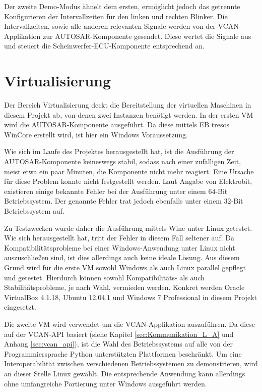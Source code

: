 \documentclass[
  a4paper,					    %
  twoside,
  DIV=calc,     				%
  bibliography=totoc,
  cleardoublepage=empty,
  ngerman,     					%
  final       					%
]{scrbook}
\begin{document}
Der zweite Demo-Modus ähnelt dem ersten, ermöglicht jedoch das getrennte Konfigurieren der Intervallzeiten für den linken und rechten Blinker. Die Intervallzeiten, sowie alle anderen relevanten Signale werden von der VCAN-Applikation zur AUTOSAR-Komponente gesendet. Diese wertet die Signale aus und steuert die Scheinwerfer-ECU-Komponente entsprechend an.


\section{Virtualisierung}
\label{sec:Virtualisierung_Umgesetzt}
Der Bereich Virtualisierung deckt die Bereitstellung der virtuellen Maschinen in diesem Projekt ab, von denen zwei Instanzen benötigt werden. In der ersten VM wird die AUTOSAR-Komponente ausgeführt. Da diese mittels EB tresos WinCore erstellt wird, ist hier ein Windows Voraussetzung.

Wie sich im Laufe des Projektes herausgestellt hat, ist die Ausführung der AUTOSAR-Komponente keineswegs stabil, sodass nach einer zufälligen Zeit, meist etwa ein paar Minuten, die Komponente nicht mehr reagiert. Eine Ursache für diese Problem konnte nicht festgestellt werden. Laut Angabe von Elektrobit, existieren einige bekannte Fehler bei der Ausführung unter einem 64-Bit Betriebssystem. Der genannte Fehler trat jedoch ebenfalls unter einem 32-Bit Betriebssystem auf.

Zu Testzwecken wurde daher die Ausführung mittels Wine unter Linux getestet. Wie sich herausgestellt hat, tritt der Fehler in diesem Fall seltener auf. Da Kompatibilitätsprobleme bei einer Windows-Anwendung unter Linux nicht auszuschließen sind, ist dies allerdings auch keine ideale Lösung. Aus diesem Grund wird für die erste VM sowohl Windows als auch Linux parallel gepflegt und getestet. Hierdurch können sowohl Kompatibilitäts- als auch Stabilitätsprobleme, je nach Wahl, vermieden werden. Konkret werden Oracle VirtualBox 4.1.18, Ubuntu 12.04.1 und Windows 7 Professional in diesem Projekt eingesetzt.

Die zweite VM wird verwendet um die VCAN-Applikation auszuführen. Da diese auf der VCAN-API basiert (siehe Kapitel \ref{sec:Kommunikation_L_A} und Anhang \ref{sec:vcan_api}), ist die Wahl des Betriebssystems auf alle von der Programmiersprache Python unterstützten Plattformen beschränkt. Um eine Interoperabilität zwischen verschiedenen Betriebssystemen zu demonstrieren, wird an dieser Stelle Linux gewählt. Die entsprechende Anwendung kann allerdings ohne umfangreiche Portierung unter Windows ausgeführt werden.
\end{document}
